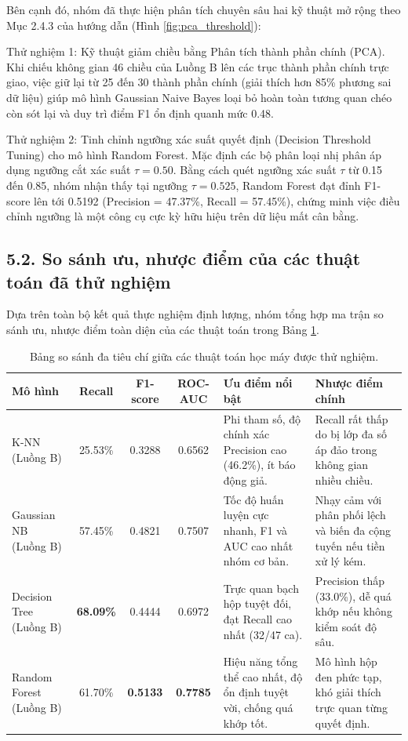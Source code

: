 \documentclass[12pt,a4paper]{article}
\begin{document}
Bên cạnh đó, nhóm đã thực hiện phân tích chuyên sâu hai kỹ thuật mở rộng theo Mục 2.4.3 của hướng dẫn (Hình \ref{fig:pca_threshold}):

Thử nghiệm 1: Kỹ thuật giảm chiều bằng Phân tích thành phần chính (PCA). Khi chiếu không gian 46 chiều của Luồng B lên các trục thành phần chính trực giao, việc giữ lại từ 25 đến 30 thành phần chính (giải thích hơn 85\% phương sai dữ liệu) giúp mô hình Gaussian Naive Bayes loại bỏ hoàn toàn tương quan chéo còn sót lại và duy trì điểm F1 ổn định quanh mức 0.48.

Thử nghiệm 2: Tinh chỉnh ngưỡng xác suất quyết định (Decision Threshold Tuning) cho mô hình Random Forest. Mặc định các bộ phân loại nhị phân áp dụng ngưỡng cắt xác suất $\tau = 0.50$. Bằng cách quét ngưỡng xác suất $\tau$ từ 0.15 đến 0.85, nhóm nhận thấy tại ngưỡng $\tau = 0.525$, Random Forest đạt đỉnh F1-score lên tới 0.5192 (Precision = 47.37\%, Recall = 57.45\%), chứng minh việc điều chỉnh ngưỡng là một công cụ cực kỳ hữu hiệu trên dữ liệu mất cân bằng.

\subsection{5.2. So sánh ưu, nhược điểm của các thuật toán đã thử nghiệm}
Dựa trên toàn bộ kết quả thực nghiệm định lượng, nhóm tổng hợp ma trận so sánh ưu, nhược điểm toàn diện của các thuật toán trong Bảng \ref{tab:algo_comparison}.

\begin{table}[H]
\centering
\caption{Bảng so sánh đa tiêu chí giữa các thuật toán học máy được thử nghiệm.}
\label{tab:algo_comparison}
\small
\begin{tabular}{|p{2.8cm}|c|c|c|p{4.0cm}|p{4.0cm}|}
\hline
\textbf{Mô hình} & \textbf{Recall} & \textbf{F1-score} & \textbf{ROC-AUC} & \textbf{Ưu điểm nổi bật} & \textbf{Nhược điểm chính} \\
\hline
K-NN (Luồng B) & 25.53\% & 0.3288 & 0.6562 & Phi tham số, độ chính xác Precision cao (46.2\%), ít báo động giả. & Recall rất thấp do bị lớp đa số áp đảo trong không gian nhiều chiều. \\
\hline
Gaussian NB (Luồng B) & 57.45\% & 0.4821 & 0.7507 & Tốc độ huấn luyện cực nhanh, F1 và AUC cao nhất nhóm cơ bản. & Nhạy cảm với phân phối lệch và biến đa cộng tuyến nếu tiền xử lý kém. \\
\hline
Decision Tree (Luồng B) & \textbf{68.09\%} & 0.4444 & 0.6972 & Trực quan bạch hộp tuyệt đối, đạt Recall cao nhất (32/47 ca). & Precision thấp (33.0\%), dễ quá khớp nếu không kiểm soát độ sâu. \\
\hline
Random Forest (Luồng B) & 61.70\% & \textbf{0.5133} & \textbf{0.7785} & Hiệu năng tổng thể cao nhất, độ ổn định tuyệt vời, chống quá khớp tốt. & Mô hình hộp đen phức tạp, khó giải thích trực quan từng quyết định. \\
\hline
\end{tabular}
\end{table}
\end{document}
